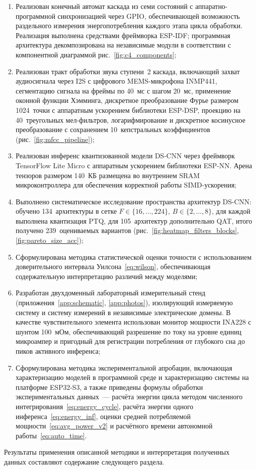 \begin{enumerate}
	\item Реализован конечный автомат каскада из семи состояний
	      с аппаратно-программной синхронизацией через GPIO,
	      обеспечивающей возможность раздельного измерения
	      энергопотребления каждого этапа цикла обработки.
	      Реализация выполнена средствами фреймворка ESP-IDF;
	      программная архитектура декомпозирована на независимые
	      модули в соответствии с компонентной диаграммой
	      рис.~\ref{fig:c4_components};
	\item Реализован тракт обработки звука ступени~2 каскада,
	      включающий захват аудиосигнала через I2S с цифрового
	      MEMS-микрофона INMP441, сегментацию сигнала на фреймы
	      по 40~мс с шагом 20~мс, применение оконной функции
	      Хэмминга, дискретное преобразование Фурье размером
	      1024~точки с аппаратным ускорением библиотеки ESP-DSP,
	      проекцию на 40~треугольных мел-фильтров,
	      логарифмирование и дискретное косинусное преобразование
	      с сохранением 10~кепстральных коэффициентов
	      (рис.~\ref{fig:mfcc_pipeline});
	\item Реализован инференс квантизованной модели DS-CNN через
	      фреймворк TensorFlow Lite Micro с аппаратным ускорением
	      библиотеки ESP-NN. Арена тензоров размером 140~КБ
	      размещена во внутреннем SRAM микроконтроллера для
	      обеспечения корректной работы SIMD-ускорения;
	\item Выполнено систематическое исследование пространства
	      архитектур DS-CNN: обучено 134~архитектуры в сетке
	      $F \in \{16, \ldots, 224\}$, $B \in \{2, \ldots, 8\}$,
	      для каждой выполнена квантизация PTQ, для
	      105~архитектур дополнительно QAT, итого получено
	      239~оцениваемых вариантов
	      (рис.~\ref{fig:heatmap_filters_blocks},
	      \ref{fig:pareto_size_acc});
	\item Сформулирована методика статистической оценки
	      точности с использованием доверительного интервала
	      Уилсона~\eqref{eq:wilson}, обеспечивающая
	      содержательную интерпретацию различий между моделями;
	\item Разработан двухдоменный лабораторный измерительный
	      стенд (приложения~\ref{app:schematic},
	      \ref{app:photos}), изолирующий измеряемую систему и
	      систему измерений в независимые электрические домены. В
	      качестве чувствительного элемента использован монитор
	      мощности INA228 с шунтом 100~мОм, обеспечивающий
	      разрешение по току на уровне единиц микроампер и
	      пригодный для регистрации потребления от глубокого сна
	      до пиков активного инференса;
	\item Сформулирована методика экспериментальной апробации,
	      включающая характеризацию моделей в программной среде
	      и характеризацию системы на платформе ESP32-S3, а также
	      приведены формулы обработки экспериментальных
	      данных~--- расчёта энергии цикла методом численного
	      интегрирования~\eqref{eq:energy_cycle}, расчёта энергии
	      одного инференса~\eqref{eq:energy_inf}, оценки средней
	      потребляемой мощности~\eqref{eq:avg_power_v2} и
	      расчётного времени автономной работы~\eqref{eq:auto_time}.
\end{enumerate}

Результаты применения описанной методики и интерпретация
полученных данных составляют содержание следующего раздела.
